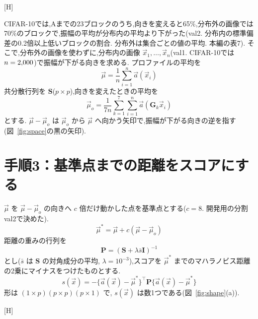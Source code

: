 \documentclass[MIRU,submit,onecolumn]{miru2025j}
\makeatletter
\newcommand{\vmu}{\vec{\mu}}\newcommand{\va}{\vec{a}}\newcommand{\vx}{\vec{x}}\newcommand{\vu}{\vec{u}}\newcommand{\vv}{\vec{v}}
\newcommand{\Pm}{\mathbf{P}}\newcommand{\Sm}{\mathbf{S}}\newcommand{\Id}{\mathbf{I}}\newcommand{\Gm}{\mathbf{G}}
\renewenvironment{figure}{\@floatenv\capwidth\textwidth\ecapwidth\textwidth\abovecaptionskip1mm\belowcaptionskip\z@\@float{figure}}{\end@float}
\makeatother
\begin{document}
\begin{figure}[H]\centering

\caption{手順2の準備：向きを変えた分布内の画像. (a) 8つの向き. (b) ブロックごとの振幅の平均の模式図. 向きを変えた画像(灰)と分布外の画像(赤)は,分布内の画像(紺)より下がる.}
\label{fig:orient}
\end{figure}

CIFAR-10では,Aまでの23ブロックのうち,向きを変えると65\%,分布外の画像では70\%のブロックで,振幅の平均が分布内の平均より下がった(val2. 分布内の標準偏差の0.2倍以上低いブロックの割合. 分布外は集合ごとの値の平均. 本編の表7). そこで,分布外の画像を使わずに,分布内の画像 $\vx_{1},\dots,\vx_{n}$(val1. CIFAR-10では $n=2{,}000$)で振幅が下がる向きを求める. プロファイルの平均を
\begin{equation}
\vmu=\frac{1}{n}\sum_{i=1}^{n}\va(\vx_{i})
\label{eq:mu}
\end{equation}
共分散行列を $\Sm$($p\times p$),向きを変えたときの平均を
\begin{equation}
\vmu_{o}=\frac{1}{7n}\sum_{k=1}^{7}\sum_{i=1}^{n}\va(\Gm_{k}\vx_{i})
\label{eq:muo}
\end{equation}
とする. $\vmu-\vmu_{o}$ は $\vmu_{o}$ から $\vmu$ へ向かう矢印で,振幅が下がる向きの逆を指す(図~\ref{fig:space}の黒の矢印).

\section{手順3：基準点までの距離をスコアにする}
\label{sec:step3}
$\vmu$ を $\vmu-\vmu_{o}$ の向きへ $c$ 倍だけ動かした点を基準点とする($c=8$. 開発用の分割val2で決めた).
\begin{equation}
\vmu^{*}=\vmu+c(\vmu-\vmu_{o})
\label{eq:mustar}
\end{equation}
距離の重みの行列を
\begin{equation}
\Pm=(\Sm+\lambda\bar{s}\Id)^{-1}
\label{eq:prec}
\end{equation}
とし($\bar{s}$ は $\Sm$ の対角成分の平均, $\lambda=10^{-3}$),スコアを $\vmu^{*}$ までのマハラノビス距離の2乗にマイナスをつけたものとする.
\begin{equation}
s(\vx)=-\{\va(\vx)-\vmu^{*}\}^{\top}\Pm\{\va(\vx)-\vmu^{*}\}
\label{eq:score}
\end{equation}
形は $(1\times p)(p\times p)(p\times 1)$ で, $s(\vx)$ は数1つである(図~\ref{fig:shape}(a)).

\begin{figure}[H]\centering

\caption{手順3：プロファイルの空間(CIFAR-10の $\Delta=\olDeltaCten$, $c=8$ で縮尺どおり). 横：$\vmu-\vmu_{o}$ の向き. 縦：ほかの向きの1つ. 点は模式図(紺：分布内,灰：向きを変えた画像). $\vmu^{*}$ は $\vmu$ から $\vmu-\vmu_{o}$ の8倍だけ右にある. 赤の破線：スコアが等しい線.}
\label{fig:space}
\end{figure}
\end{document}
